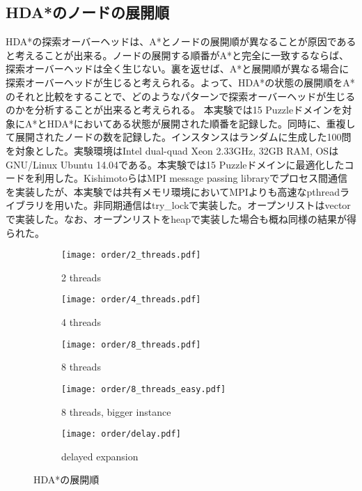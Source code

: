 \documentclass[uplatex]{jsarticle}
\begin{document}
\subsection{HDA*のノードの展開順}
HDA*の探索オーバーヘッドは、A*とノードの展開順が異なることが原因であると考えることが出来る。ノードの展開する順番がA*と完全に一致するならば、探索オーバーヘッドは全く生じない。裏を返せば、A*と展開順が異なる場合に探索オーバーヘッドが生じると考えられる。よって、HDA*の状態の展開順をA*のそれと比較をすることで、どのようなパターンで探索オーバーヘッドが生じるのかを分析することが出来ると考えられる。
本実験では15 Puzzleドメインを対象にA*とHDA*においてある状態が展開された順番を記録した。同時に、重複して展開されたノードの数を記録した。インスタンスはランダムに生成した100問を対象とした。実験環境はIntel dual-quad Xeon 2.33GHz, 32GB RAM, OSはGNU/Linux Ubuntu 14.04である。本実験では15 Puzzleドメインに最適化したコードを利用した。KishimotoらはMPI message passing libraryでプロセス間通信を実装したが、本実験では共有メモリ環境においてMPIよりも高速なpthreadライブラリを用いた。非同期通信はtry\_lockで実装した。オープンリストはvectorで実装した。なお、オープンリストをheapで実装した場合も概ね同様の結果が得られた。
\newline

\begin{figure}[h]
	\centering
	\begin{subfigure}{0.45\columnwidth}
		\centering
		\texttt{[image: order/2\_threads.pdf]}
		\caption{2 threads}
		\label{fig:order_2_threads}
	\end{subfigure}
	\begin{subfigure}{0.45\columnwidth}
		\centering
		\texttt{[image: order/4\_threads.pdf]}
		\caption{4 threads}
		\label{fig:order_4_threads}
	\end{subfigure}
	\begin{subfigure}{0.45\columnwidth}
		\centering
		\texttt{[image: order/8\_threads.pdf]}
		\caption{8 threads}
		\label{fig:order_8_threads}
	\end{subfigure}
	\begin{subfigure}{0.45\columnwidth}
		\centering
		\texttt{[image: order/8\_threads\_easy.pdf]}
		\caption{8 threads, bigger instance}
		\label{fig:order_8_threads_easy}
	\end{subfigure}
	\begin{subfigure}{0.45\columnwidth}
		\centering
		\texttt{[image: order/delay.pdf]}
		\caption{delayed expansion}
		\label{fig:order_delay}
	\end{subfigure}
	\caption{HDA*の展開順}
	\label{fig:hdastar_orders}
\end{figure}
\end{document}
